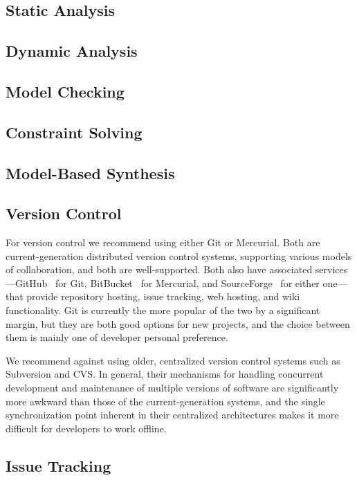\subsection{Static Analysis}

\subsection{Dynamic Analysis}

\subsection{Model Checking}

\subsection{Constraint Solving}

\subsection{Model-Based Synthesis}

\subsection{Version Control}

For version control we recommend using either Git or Mercurial. Both
are current-generation distributed version control systems, supporting
various models of collaboration, and both are well-supported. Both
also have associated services---GitHub~\cite{GitHub} for Git,
BitBucket~\cite{BitBucket} for Mercurial, and
SourceForge~\cite{SourceForge} for either one---that provide
repository hosting, issue tracking, web hosting, and wiki
functionality. Git is currently the more popular of the two by a
significant margin, but they are both good options for new projects,
and the choice between them is mainly one of developer personal
preference.

We recommend against using older, centralized version control systems
such as Subversion and CVS. In general, their mechanisms for handling
concurrent development and maintenance of multiple versions of
software are significantly more awkward than those of the
current-generation systems, and the single synchronization point
inherent in their centralized architectures makes it more difficult
for developers to work offline.

\subsection{Issue Tracking}

